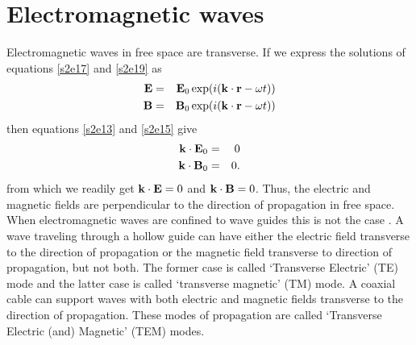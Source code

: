\documentclass[11pt]{article}
\numberwithin{equation}{section}
\begin{document}
\section{Electromagnetic waves}\label{s3}
Electromagnetic waves in free space are transverse. If we express the solutions
of equations \eqref{s2e17} and \eqref{s2e19} as
\begin{eqnarray}
\vb{E} &=& \vb{E}_0\exp(i(\vb{k}\cdot\vb{r} - \omega t)) \label{s3e1} \\
\vb{B} &=& \vb{B}_0\exp(i(\vb{k}\cdot\vb{r} - \omega t)) \label{s3e2} 
\end{eqnarray}
then equations \eqref{s2e13} and \eqref{s2e15} give
\begin{eqnarray}
\vb{k}\cdot\vb{E}_0 &=& 0 \label{s3e3} \\
\vb{k}\cdot\vb{B}_0 &=& 0. \label{s3e4}
\end{eqnarray}
from which we readily get $\vb{k}\cdot\vb{E} = 0$ and $\vb{k}\cdot\vb{B} = 0$.
Thus, the electric and magnetic fields are perpendicular to the direction of
propagation in free space. When electromagnetic waves are confined to wave
guides this is not the case \cite{griffiths2005introduction}. A wave traveling
through a hollow guide can have either the electric field transverse to the
direction of propagation or the magnetic field transverse to direction of
propagation, but not both. The former case is called `Transverse Electric' 
(TE) mode and the latter case is called `transverse magnetic' (TM) mode. A 
coaxial cable can support waves with both electric and magnetic fields 
transverse to the direction of propagation. These modes of propagation are
called `Transverse Electric (and) Magnetic' (TEM) modes.
\end{document}
